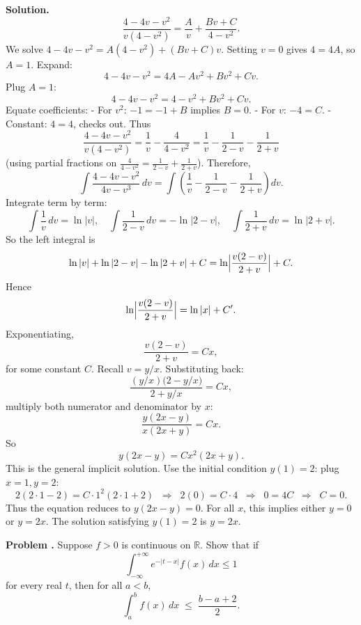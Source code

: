 \documentclass[12pt, a4paper, oneside]{article}
\newcounter{problemname}
\newenvironment{problem}
  {\begin{shaded}\stepcounter{problemname}\par\noindent\textbf{Problem \arabic{problemname}. }\newline}
  {\end{shaded}\par}
\newenvironment{solution}
  {\par\noindent\textbf{Solution. }\newline}
  {\par}
\begin{document}
\begin{solution}
\[\frac{4 - 4v - v^2}{v(4 - v^2)} = \frac{A}{v} + \frac{Bv + C}{4 - v^2}.
\]
We solve \(4 - 4v - v^2 = A(4 - v^2) + (Bv + C)v\). Setting \(v=0\) gives \(4 = 4A\), so \(A=1\). Expand:
\[
4 - 4v - v^2 = 4A - A v^2 + Bv^2 + C v.
\]
Plug \(A=1\):
\[
4 - 4v - v^2 = 4 - v^2 + Bv^2 + Cv.
\]
Equate coefficients:
- For \(v^2\): \(-1 = -1 + B\) implies \(B=0\).
- For \(v\): \(-4 = C\).
- Constant: \(4=4\), checks out.
Thus
\[
\frac{4 - 4v - v^2}{v(4 - v^2)} = \frac{1}{v} - \frac{4}{4 - v^2} = \frac{1}{v} - \frac{1}{2-v} - \frac{1}{2+v}
\]
(using partial fractions on \(\frac{4}{4-v^2} = \frac{1}{2-v} + \frac{1}{2+v}\)). Therefore, 
\[
\int \frac{4 - 4v - v^2}{4v - v^3}\,dv = \int \left(\frac{1}{v} - \frac{1}{2-v} - \frac{1}{2+v}\right)dv.
\]
Integrate term by term:
\[
\int \frac{1}{v}\,dv = \ln|v|,\quad
\int \frac{1}{2-v}\,dv = -\ln|2-v|,\quad
\int \frac{1}{2+v}\,dv = \ln|2+v|.
\]
So the left integral is
\[
\ln|v| + \ln|2-v| - \ln|2+v| + C = \ln\Bigl|\frac{v(2-v)}{2+v}\Bigr| + C.
\]
Hence
\[
\ln\Bigl|\frac{v(2-v)}{2+v}\Bigr| = \ln|x| + C'.
\]
Exponentiating, 
\[
\frac{v(2-v)}{2+v} = Cx,
\]
for some constant \(C\). Recall \(v = y/x\). Substituting back:
\[
\frac{(y/x)\bigl(2 - y/x\bigr)}{2 + y/x} = Cx,
\]
multiply both numerator and denominator by \(x\):
\[
\frac{y(2x - y)}{x(2x + y)} = Cx.
\]
So
\[
y(2x - y) = Cx^2 (2x + y).
\]
This is the general implicit solution. Use the initial condition \(y(1)=2\): plug \(x=1,y=2\):
\[
2(2\cdot 1 - 2) = C\cdot 1^2 (2\cdot 1 + 2) \;\;\Longrightarrow\;\; 2(0) = C\cdot 4 \;\;\Longrightarrow\;\; 0 = 4C \;\;\Longrightarrow\;\; C=0.
\]
Thus the equation reduces to \(y(2x - y) = 0\). For all \(x\), this implies either \(y=0\) or \(y=2x\). The solution satisfying \(y(1)=2\) is \(y=2x\). 
\end{solution}
\newpage
\begin{problem}
Suppose \(f>0\) is continuous on \(\mathbb{R}\). Show that if 
\[
\int_{-\infty}^{+\infty} e^{-|t-x|} f(x)\,dx \le 1
\]
for every real \(t\), then for all \(a<b\),
\[
\int_{a}^{b} f(x)\,dx \;\le\; \frac{b-a+2}{2}.
\]
\end{problem}
\end{document}
